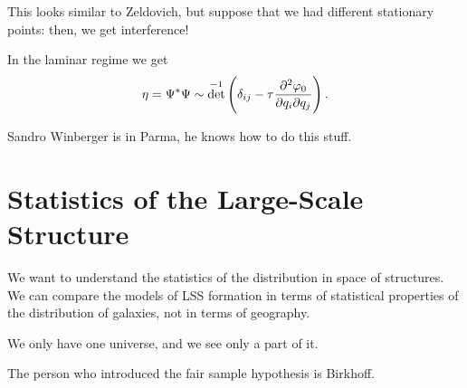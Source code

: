 \documentclass[main.tex]{subfiles}
\begin{document}
This looks similar to Zeldovich, but suppose that we had different stationary points: then, we get interference! 

In the laminar regime we get 
%
\begin{align}
\eta = \Psi^{*} \Psi \sim \det^{-1} \qty(\delta_{ij} - \tau \pdv[2]{\varphi_0 }{q_{i}}{q_{j}})
\,.
\end{align}

Sandro Winberger is in Parma, he knows how to do this stuff. 

\chapter{Statistics of the Large-Scale Structure}

We want to understand the statistics of the distribution in space of structures.
We can compare the models of LSS formation in terms of statistical properties of the distribution of galaxies, not in terms of geography. 

We only have one universe, and we see only a part of it. 

The person who introduced the fair sample hypothesis is Birkhoff. 
\end{document}

